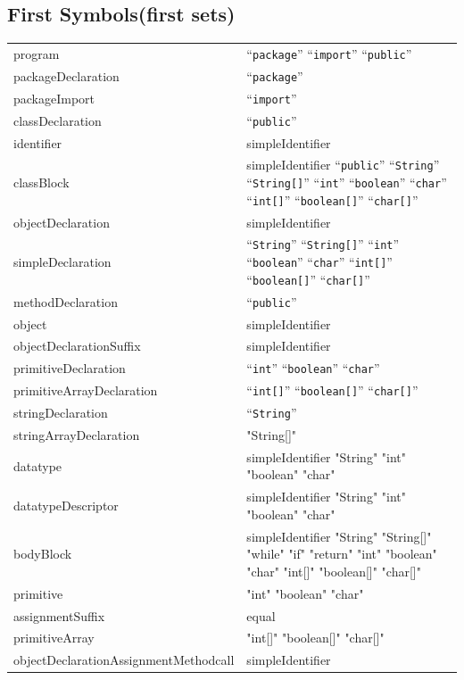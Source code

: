 \subsection{First Symbols(first sets)}
\label{first_sets}
\noindent
\begin{tabularx}{\linewidth}{YY}
program & ``\texttt{package}'' ``\texttt{import}'' ``\texttt{public}'' \\
packageDeclaration & ``\texttt{package}'' \\
packageImport & ``\texttt{import}'' \\
classDeclaration & ``\texttt{public}'' \\
identifier & simpleIdentifier \\
classBlock & simpleIdentifier ``\texttt{public}'' ``\texttt{String}'' ``\texttt{String[]}'' ``\texttt{int}'' ``\texttt{boolean}'' ``\texttt{char}'' ``\texttt{int[]}'' ``\texttt{boolean[]}'' ``\texttt{char[]}'' \\
objectDeclaration & simpleIdentifier \\
simpleDeclaration & ``\texttt{String}'' ``\texttt{String[]}'' ``\texttt{int}'' ``\texttt{boolean}'' ``\texttt{char}'' ``\texttt{int[]}'' ``\texttt{boolean[]}'' ``\texttt{char[]}'' \\
methodDeclaration & ``\texttt{public}'' \\
object & simpleIdentifier \\
objectDeclarationSuffix & simpleIdentifier \\
primitiveDeclaration & ``\texttt{int}'' ``\texttt{boolean}'' ``\texttt{char}'' \\
primitiveArrayDeclaration & ``\texttt{int[]}'' ``\texttt{boolean[]}'' ``\texttt{char[]}'' \\
stringDeclaration & ``\texttt{String}'' \\
stringArrayDeclaration & "String[]" \\
datatype & simpleIdentifier "String" "int" "boolean" "char" \\
datatypeDescriptor & simpleIdentifier "String" "int" "boolean" "char" \\
bodyBlock & simpleIdentifier "String" "String[]" "while" "if" "return" "int" "boolean" "char" "int[]" "boolean[]" "char[]" \\
primitive & "int" "boolean" "char" \\
assignmentSuffix & equal \\
primitiveArray & "int[]" "boolean[]" "char[]" \\
objectDeclarationAssignmentMethodcall & simpleIdentifier \\

\end{tabularx}
